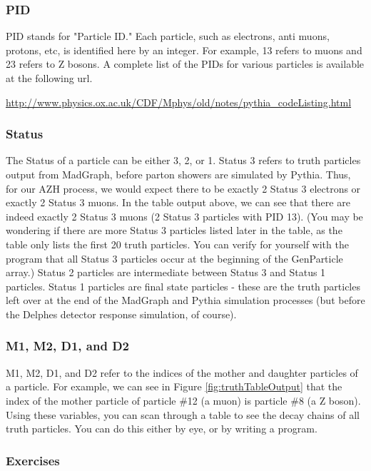 \documentclass{article}
\begin{document}
\subsubsection{PID}

PID stands for "Particle ID." Each particle, such as electrons, anti muons, protons, etc, is
identified here by an integer. For example, 13 refers to muons and 23 refers to Z bosons. A
complete list of the PIDs for various particles is available at the following url.

\bigskip

\url{http://www.physics.ox.ac.uk/CDF/Mphys/old/notes/pythia_codeListing.html}

\subsubsection{Status}

The Status of a particle can be either 3, 2, or 1. Status 3 refers to truth particles output
from MadGraph, before parton showers are simulated by Pythia. Thus, for our AZH process, we
would expect there to be exactly 2 Status 3 electrons or exactly 2 Status 3 muons. In the table
output above, we can see that there are indeed exactly 2 Status 3 muons (2 Status 3 particles
with PID 13). (You may be wondering if there are more Status 3 particles listed later in the
table, as the table only lists the first 20 truth particles. You can verify for yourself with
the program that all Status 3 particles occur at the beginning of the GenParticle array.) Status
2 particles are intermediate between Status 3 and Status 1 particles. Status 1 particles are final
state particles - these are the truth particles left over at the end of the MadGraph and Pythia
simulation processes (but before the Delphes detector response simulation, of course).

\subsubsection{M1, M2, D1, and D2}

M1, M2, D1, and D2 refer to the indices of the mother and daughter particles of a particle.
For example, we can see in Figure \ref{fig:truthTableOutput} that the index of the mother particle
of particle \#12 (a muon) is particle \#8 (a Z boson). Using these variables, you can scan through
a table to see the decay chains of all truth particles. You can do this either by eye, or by writing a program.

\subsubsection*{Exercises}
\end{document}
